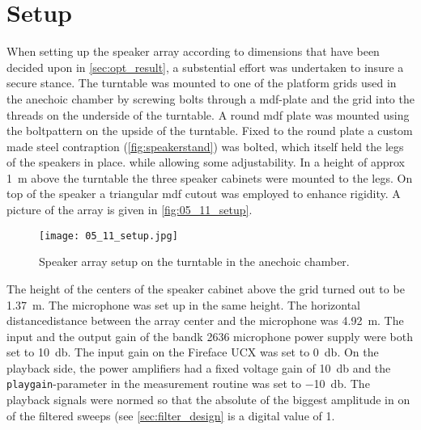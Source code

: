 \section*{Setup}
When setting up the speaker array according to dimensions that have been decided upon in \autoref{sec:opt_result}, a substential effort was undertaken to insure a secure stance. The turntable was mounted to one of the platform grids used in the anechoic chamber by screwing bolts through a \gls{mdf}-plate and the grid into the threads on the underside of the turntable. A round \gls{mdf} plate was mounted using the boltpattern on the upside of the turntable. Fixed to the round plate a custom made steel contraption (\autoref{fig:speakerstand}) was bolted, which itself held the legs of the speakers in place. while allowing some adjustability. In a height of approx \SI{1}{\meter} above the turntable the three speaker cabinets were mounted to the legs. On top of the speaker a triangular \gls{mdf} cutout was employed to enhance rigidity. A picture of the array is given in \autoref{fig:05_11_setup}.

\begin{figure}[h]\label{fig:05_11_setup}
	\centering
    \texttt{[image: 05\_11\_setup.jpg]}
    \caption{Speaker array setup on the turntable in the anechoic chamber.}
\end{figure}

The height of the centers of the speaker cabinet above the grid turned out to be \SI{1.37}{\meter}. The microphone was set up in the same height. The horizontal distancedistance between the array center and the microphone was \SI{4.92}{\meter}.
The input and the output gain of the \gls{bandk} 2636 microphone power supply were both set to \SI{+10}{\decibel}. The input gain on the Fireface UCX was set to \SI{0}{\decibel}. On the playback side, the power amplifiers had a fixed voltage gain of \SI{+10}{\decibel} and the \texttt{playgain}-parameter in the measurement routine was set to \SI{-10}{\decibel}. The playback signals were normed so that the absolute of the biggest amplitude in on of the filtered sweeps (see \autoref{sec:filter_design} is a digital value of 1.